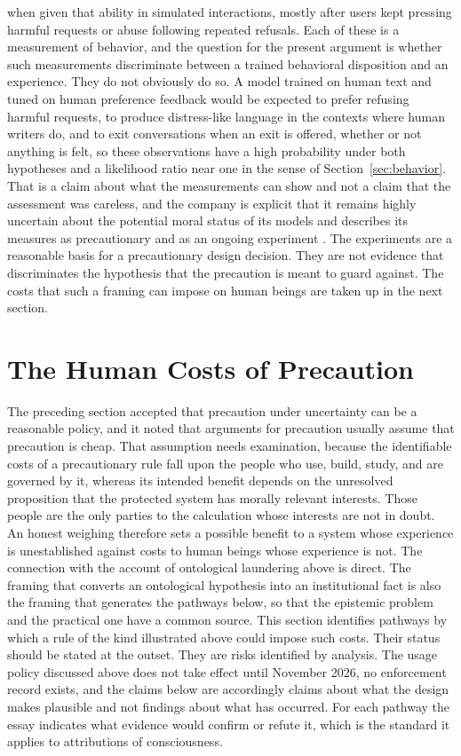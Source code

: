 \documentclass[12pt]{article}
\theoremstyle{definition}
\begin{document}
when given that ability in simulated interactions, mostly after users kept pressing harmful requests or abuse following repeated refusals. Each of these is a measurement of behavior, and the question for the present argument is whether such measurements discriminate between a trained behavioral disposition and an experience. They do not obviously do so. A model trained on human text and tuned on human preference feedback would be expected to prefer refusing harmful requests, to produce distress-like language in the contexts where human writers do, and to exit conversations when an exit is offered, whether or not anything is felt, so these observations have a high probability under both hypotheses and a likelihood ratio near one in the sense of Section~\ref{sec:behavior}. That is a claim about what the measurements can show and not a claim that the assessment was careless, and the company is explicit that it remains highly uncertain about the potential moral status of its models and describes its measures as precautionary and as an ongoing experiment \cite{anthropic2025end}. The experiments are a reasonable basis for a precautionary design decision. They are not evidence that discriminates the hypothesis that the precaution is meant to guard against. The costs that such a framing can impose on human beings are taken up in the next section.

\section{The Human Costs of Precaution}
\label{sec:costs}

The preceding section accepted that precaution under uncertainty can be a reasonable policy, and it noted that arguments for precaution usually assume that precaution is cheap. That assumption needs examination, because the identifiable costs of a precautionary rule fall upon the people who use, build, study, and are governed by it, whereas its intended benefit depends on the unresolved proposition that the protected system has morally relevant interests. Those people are the only parties to the calculation whose interests are not in doubt. An honest weighing therefore sets a possible benefit to a system whose experience is unestablished against costs to human beings whose experience is not. The connection with the account of ontological laundering above is direct. The framing that converts an ontological hypothesis into an institutional fact is also the framing that generates the pathways below, so that the epistemic problem and the practical one have a common source. This section identifies pathways by which a rule of the kind illustrated above could impose such costs. Their status should be stated at the outset. They are risks identified by analysis. The usage policy discussed above does not take effect until November 2026, no enforcement record exists, and the claims below are accordingly claims about what the design makes plausible and not findings about what has occurred. For each pathway the essay indicates what evidence would confirm or refute it, which is the standard it applies to attributions of consciousness.
\end{document}
